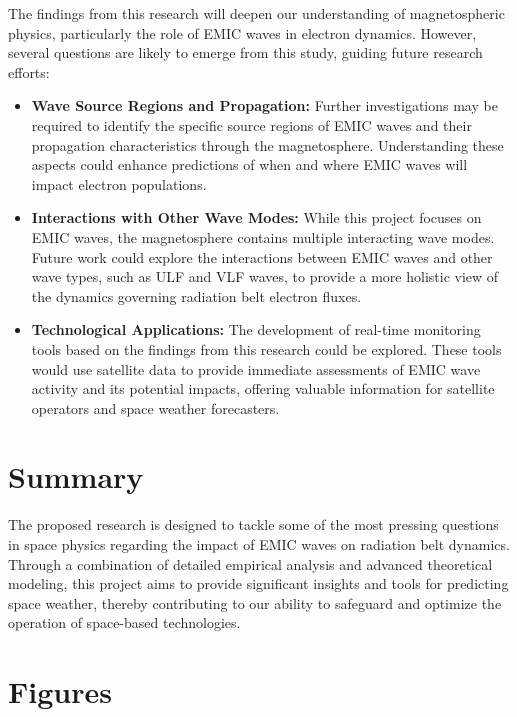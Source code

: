 \documentclass[
  letterpaper,
  DIV=11,
  numbers=noendperiod]{scrartcl}
\begin{document}
The findings from this research will deepen our understanding of magnetospheric physics, particularly the role of EMIC waves in electron dynamics. However, several questions are likely to emerge from this study, guiding future research efforts:

\begin{itemize}
\item
  \textbf{Wave Source Regions and Propagation:} Further investigations may be required to identify the specific source regions of EMIC waves and their propagation characteristics through the magnetosphere. Understanding these aspects could enhance predictions of when and where EMIC waves will impact electron populations.
\item
  \textbf{Interactions with Other Wave Modes:} While this project focuses on EMIC waves, the magnetosphere contains multiple interacting wave modes. Future work could explore the interactions between EMIC waves and other wave types, such as ULF and VLF waves, to provide a more holistic view of the dynamics governing radiation belt electron fluxes.
\item
  \textbf{Technological Applications:} The development of real-time monitoring tools based on the findings from this research could be explored. These tools would use satellite data to provide immediate assessments of EMIC wave activity and its potential impacts, offering valuable information for satellite operators and space weather forecasters.
\end{itemize}

\section{Summary}\label{summary}

The proposed research is designed to tackle some of the most pressing questions in space physics regarding the impact of EMIC waves on radiation belt dynamics. Through a combination of detailed empirical analysis and advanced theoretical modeling, this project aims to provide significant insights and tools for predicting space weather, thereby contributing to our ability to safeguard and optimize the operation of space-based technologies.

\section{Figures}\label{figures}
\end{document}
